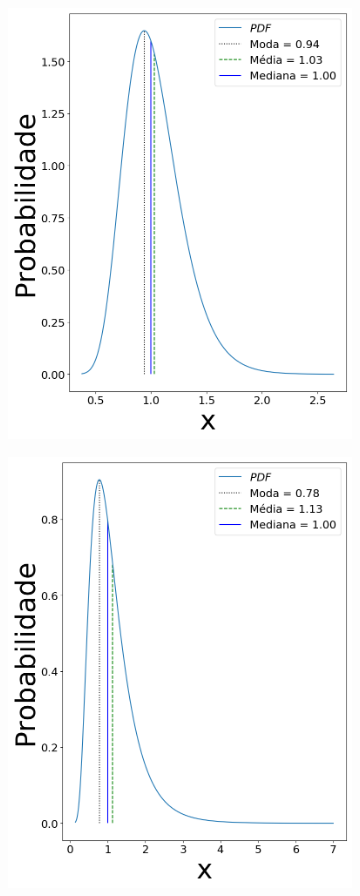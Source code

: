 \begin{figure}[H]
\begin{subfigure}[b]{0.3\textwidth}
		\includegraphics[width=\textwidth]{./figuras/log_sigma_025}
		\caption{}
		\label{fig:sig025}
	\end{subfigure}
	\hfill
	\begin{subfigure}[b]{0.3\textwidth}
		\centering 
		\includegraphics[width=\textwidth]{./figuras/log_sigma_05}

\end{subfigure}
\end{figure}

